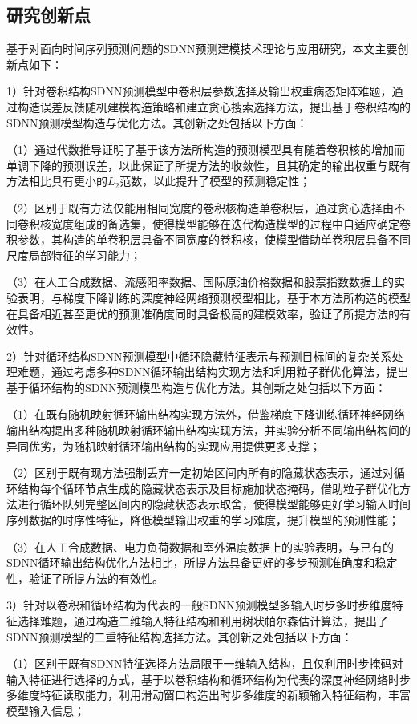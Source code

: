 \subsection{研究创新点}
基于对面向时间序列预测问题的SDNN预测建模技术理论与应用研究，本文主要创新点如下：

1）针对卷积结构SDNN预测模型中卷积层参数选择及输出权重病态矩阵难题，通过构造误差反馈随机建模构造策略和建立贪心搜索选择方法，提出基于卷积结构的SDNN预测模型构造与优化方法。其创新之处包括以下方面：

（1）通过代数推导证明了基于该方法所构造的预测模型具有随着卷积核的增加而单调下降的预测误差，以此保证了所提方法的收敛性，且其确定的输出权重与既有方法相比具有更小的$L_2$范数，以此提升了模型的预测稳定性；

（2）区别于既有方法仅能用相同宽度的卷积核构造单卷积层，通过贪心选择由不同卷积核宽度组成的备选集，使得模型能够在迭代构造模型的过程中自适应确定卷积参数，其构造的单卷积层具备不同宽度的卷积核，使模型借助单卷积层具备不同尺度局部特征的学习能力；

（3）在人工合成数据、流感阳率数据、国际原油价格数据和股票指数数据上的实验表明，与梯度下降训练的深度神经网络预测模型相比，基于本方法所构造的模型在具备相近甚至更优的预测准确度同时具备极高的建模效率，验证了所提方法的有效性。


2）针对循环结构SDNN预测模型中循环隐藏特征表示与预测目标间的复杂关系处理难题，通过考虑多种SDNN循环输出结构实现方法和利用粒子群优化算法，提出基于循环结构的SDNN预测模型构造与优化方法。其创新之处包括以下方面：

（1）在既有随机映射循环输出结构实现方法外，借鉴梯度下降训练循环神经网络输出结构提出多种随机映射循环输出结构实现方法，并实验分析不同输出结构间的异同优劣，为随机映射循环输出结构的实现应用提供更多支撑；

（2）区别于既有现方法强制丢弃一定初始区间内所有的隐藏状态表示，通过对循环结构每个循环节点生成的隐藏状态表示及目标施加状态掩码，借助粒子群优化方法进行循环队列完整区间内的隐藏状态表示取舍，使得模型能够更好学习输入时间序列数据的时序性特征，降低模型输出权重的学习难度，提升模型的预测性能；

（3）在人工合成数据、电力负荷数据和室外温度数据上的实验表明，与已有的SDNN循环输出结构优化方法相比，所提方法具备更好的多步预测准确度和稳定性，验证了所提方法的有效性。


3）针对以卷积和循环结构为代表的一般SDNN预测模型多输入时步多时步维度特征选择难题，通过构造二维输入特征结构和利用树状帕尔森估计算法，提出了SDNN预测模型的二重特征结构选择方法。其创新之处包括以下方面：

（1）区别于既有SDNN特征选择方法局限于一维输入结构，且仅利用时步掩码对输入特征进行选择的方式，基于以卷积结构和循环结构为代表的深度神经网络时步多维度特征读取能力，利用滑动窗口构造出时步多维度的新颖输入特征结构，丰富模型输入信息；

